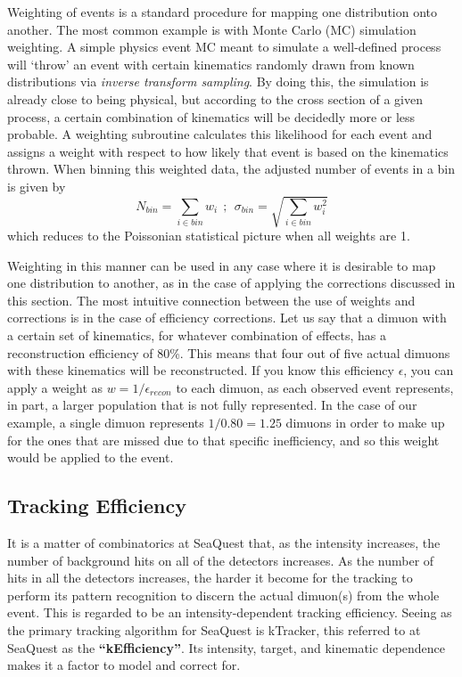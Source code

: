 Weighting of events is a standard procedure for mapping one distribution onto another. The most common example is with Monte Carlo (MC) simulation weighting. A simple physics event MC meant to simulate a well-defined process will `throw' an event with certain kinematics randomly drawn from known distributions via \emph{inverse transform sampling}. By doing this, the simulation is already close to being physical, but according to the cross section of a given process, a certain combination of kinematics will be decidedly more or less probable. A weighting subroutine calculates this likelihood for each event and assigns a weight with respect to how likely that event is based on the kinematics thrown. When binning this weighted data, the adjusted number of events in a bin is given by
\begin{equation}
	N_{bin} = \sum_{i \in bin} w_i\ \ ;\ \ \sigma_{bin} = \sqrt{\sum_{i\in bin} w_i^2}
	\label{eq:gmc-weight}
\end{equation}
which reduces to the Poissonian statistical picture when all weights are 1.

Weighting in this manner can be used in any case where it is desirable to map one distribution to another, as in the case of applying the corrections discussed in this section. The most intuitive connection between the use of weights and corrections is in the case of efficiency corrections. Let us say that a dimuon with a certain set of kinematics, for whatever combination of effects, has a reconstruction efficiency of 80\%. This means that four out of five actual dimuons with these kinematics will be reconstructed. If you know this efficiency $\epsilon$, you can apply a weight as $w = 1/\epsilon_{recon}$ to each dimuon, as each observed event represents, in part, a larger population that is not fully represented. In the case of our example, a single dimuon represents $1/0.80 = 1.25$ dimuons in order to make up for the ones that are missed due to that specific inefficiency, and so this weight would be applied to the event.

\subsection{Tracking Efficiency}

It is a matter of combinatorics at SeaQuest that, as the intensity increases, the number of background hits on all of the detectors increases. As the number of hits in all the detectors increases, the harder it become for the tracking to perform its pattern recognition to discern the actual dimuon(s) from the whole event. This is regarded to be an intensity-dependent tracking efficiency. Seeing as the primary tracking algorithm for SeaQuest is kTracker, this referred to at SeaQuest as the \textbf{``kEfficiency''}. Its intensity, target, and kinematic dependence makes it a factor to model and correct for.

